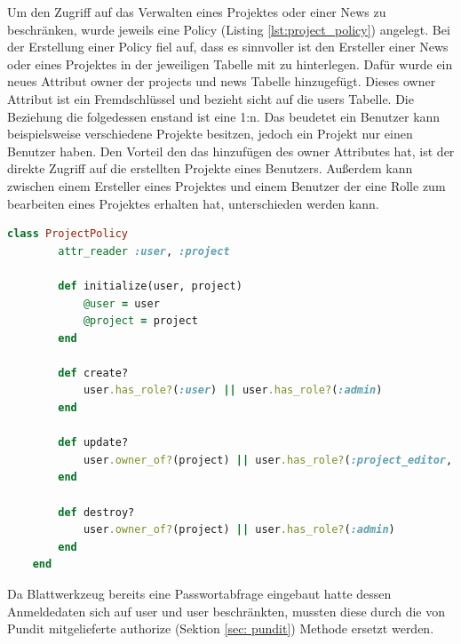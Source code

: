 \documentclass[paper=a4,fontsize=12pt,parskip=half]{scrartcl}
\begin{document}
	Um den Zugriff auf das Verwalten eines Projektes oder einer News zu beschränken, wurde jeweils eine Policy (Listing \ref{lst:project_policy}) angelegt. Bei der Erstellung einer Policy fiel auf, dass es sinnvoller ist den Ersteller einer News oder eines Projektes in der jeweiligen Tabelle mit zu hinterlegen. Dafür wurde ein neues Attribut owner der projects und news Tabelle hinzugefügt. Dieses owner Attribut ist ein Fremdschlüssel und bezieht sicht auf die users Tabelle. Die Beziehung die folgedessen enstand ist eine 1:n. Das beudetet ein Benutzer kann beispielsweise verschiedene Projekte besitzen, jedoch ein Projekt nur einen Benutzer haben. Den Vorteil den das hinzufügen des owner Attributes hat, ist der direkte Zugriff auf die erstellten Projekte eines Benutzers. Außerdem kann zwischen einem Ersteller eines Projektes und einem Benutzer der eine Rolle zum bearbeiten eines Projektes erhalten hat, unterschieden werden kann. 

	\begin{lstlisting}[language=Ruby, style=CodeView, caption=Policy zur Autorisierung eines Zugriffs auf ein Projekt, captionpos=b, label={lst:project_policy}]
	class ProjectPolicy
		attr_reader :user, :project
		
		def initialize(user, project)
			@user = user
			@project = project
		end
		
		def create?
			user.has_role?(:user) || user.has_role?(:admin)
		end
		
		def update?
			user.owner_of?(project) || user.has_role?(:project_editor, project) || user.has_role?(:admin)
		end
		
		def destroy?
			user.owner_of?(project) || user.has_role?(:admin)
		end
	end
	\end{lstlisting}
	
	Da Blattwerkzeug bereits eine Passwortabfrage eingebaut hatte dessen Anmeldedaten sich auf user und user beschränkten, mussten diese durch die von Pundit mitgelieferte authorize (Sektion \ref{sec: pundit}) Methode ersetzt werden.
	
	
\end{document}
